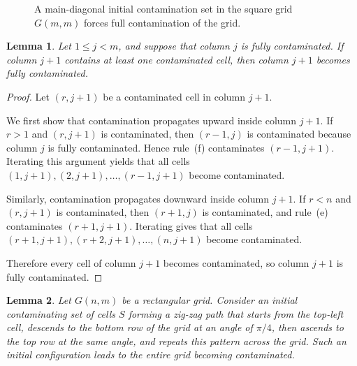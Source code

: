 \documentclass[letterpaper,12pt]{article}
\newtheorem{lemma}{Lemma}
\begin{document}
\begin{figure}[H]
\caption{A main-diagonal initial contamination set in the square grid $G(m,m)$ forces full contamination of the grid.}\label{fig:main-diagonal}  
\end{figure}


\begin{lemma}\label{lem:full-column-propagation}
Let $1 \le j < m$, and suppose that column $j$ is fully contaminated. If column $j+1$
contains at least one contaminated cell, then column $j+1$ becomes fully contaminated.
\end{lemma}

\begin{proof}
Let $(r,j+1)$ be a contaminated cell in column $j+1$.

We first show that contamination propagates upward inside column $j+1$.
If $r>1$ and $(r,j+1)$ is contaminated, then $(r-1,j)$ is contaminated because column $j$
is fully contaminated. Hence rule~(f) contaminates $(r-1,j+1)$.
Iterating this argument yields that all cells $(1,j+1),(2,j+1),\dots,(r-1,j+1)$ become contaminated.

Similarly, contamination propagates downward inside column $j+1$.
If $r<n$ and $(r,j+1)$ is contaminated, then $(r+1,j)$ is contaminated, and rule~(e)
contaminates $(r+1,j+1)$. Iterating gives that all cells $(r+1,j+1),(r+2,j+1),\dots,(n,j+1)$ become contaminated.

Therefore every cell of column $j+1$ becomes contaminated, so column $j+1$ is fully contaminated.\qedhere
\end{proof}
\begin{lemma}\label{lem:zigzag-full}
Let $G(n,m)$ be a rectangular grid. Consider an initial contaminating set of cells $S$
forming a zig-zag path that starts from the top-left cell, descends to the bottom row of
the grid at an angle of $\pi/4$, then ascends to the top row at the same angle, and repeats
this pattern across the grid. Such an initial configuration leads to the entire grid becoming
contaminated.
\end{lemma}
\end{document}
